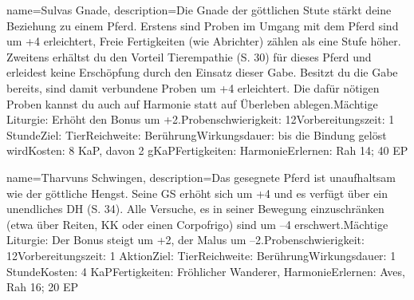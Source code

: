 {
    name={Sulvas Gnade},
    description={Die Gnade der göttlichen Stute stärkt deine Beziehung zu einem Pferd. Erstens sind Proben im Umgang mit dem Pferd sind um +4 erleichtert, Freie Fertigkeiten (wie Abrichter) zählen als eine Stufe höher. Zweitens erhältst du den Vorteil Tierempathie (S. 30) für dieses Pferd und erleidest keine Erschöpfung durch den Einsatz dieser Gabe. Besitzt du die Gabe bereits, sind damit verbundene Proben um +4 erleichtert. Die dafür nötigen Proben kannst du auch auf Harmonie statt auf Überleben ablegen.\newline Mächtige Liturgie: Erhöht den Bonus um +2.\newline Probenschwierigkeit: 12\newline Vorbereitungszeit: 1 Stunde\newline Ziel: Tier\newline Reichweite: Berührung\newline Wirkungsdauer: bis die Bindung gelöst wird\newline Kosten: 8 KaP, davon 2 gKaP\newline Fertigkeiten: Harmonie\newline Erlernen: Rah 14; 40 EP}
}


{
    name={Tharvuns Schwingen},
    description={Das gesegnete Pferd ist unaufhaltsam wie der göttliche Hengst. Seine GS erhöht sich um +4 und es verfügt über ein unendliches DH (S. 34). Alle Versuche, es in seiner Bewegung einzuschränken (etwa über Reiten, KK oder einen Corpofrigo) sind um –4 erschwert.\newline Mächtige Liturgie: Der Bonus steigt um +2, der Malus um –2.\newline Probenschwierigkeit: 12\newline Vorbereitungszeit: 1 Aktion\newline Ziel: Tier\newline Reichweite: Berührung\newline Wirkungsdauer: 1 Stunde\newline Kosten: 4 KaP\newline Fertigkeiten: Fröhlicher Wanderer, Harmonie\newline Erlernen: Aves, Rah 16; 20 EP}
}


